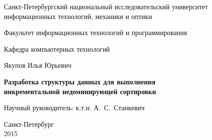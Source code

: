\documentclass[a4paper]{report}
\theoremstyle{plain}
\theoremstyle{definition}
\numberwithin{theorem}{chapter}        %
\begin{document}
\initializefrontsections

\pagestyle{title}

\begin{center}
Санкт-Петербургский национальный исследовательский университет \\ информационных технологий, механики и оптики

\vspace{2cm}

Факультет информационных технологий и программирования

Кафедра компьютерных технологий

\vspace{3cm}

{\Large Якупов Илья Юрьевич}

\vspace{2cm}

\vbox{\LARGE\bfseries
Разработка структуры данных для выполнения \\
инкрементальной недоминирующей сортировки
}

\vspace{4cm}

{\Large Научный руководитель: к.т.н. А.~С.~Станкевич}

\vspace{6cm}

Санкт-Петербург\\ 2015
\end{center}

\newpage

\setcounter{page}{3}
\pagestyle{plain}

\tableofcontents

\startthechapters



\printbibliography

%
\end{document}
